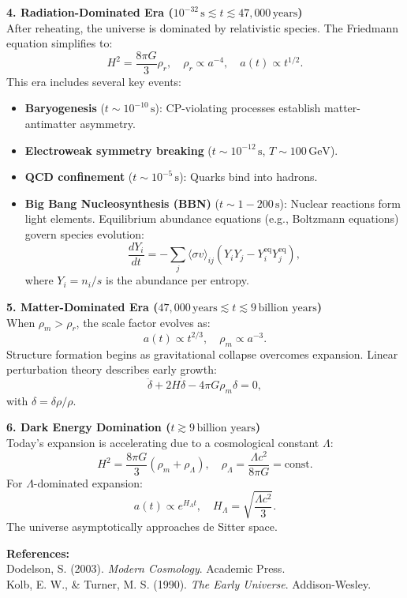 \begin{technical}
\noindent\textbf{4. Radiation-Dominated Era \boldmath(\( 10^{-32} \, \text{s} \lesssim t \lesssim 47{,}000 \, \text{years} \))}\\[0.5em]
After reheating, the universe is dominated by relativistic species. The Friedmann equation simplifies to:
\[
H^2 = \frac{8\pi G}{3} \rho_r, \quad \rho_r \propto a^{-4}, \quad a(t) \propto t^{1/2}.
\]
This era includes several key events:
\begin{itemize}
\item \textbf{Baryogenesis} (\( t \sim 10^{-10} \, \text{s} \)): CP-violating processes establish matter-antimatter asymmetry.
\item \textbf{Electroweak symmetry breaking} (\( t \sim 10^{-12} \, \text{s} \), \( T \sim 100\,\text{GeV} \)).
\item \textbf{QCD confinement} (\( t \sim 10^{-5} \, \text{s} \)): Quarks bind into hadrons.
\item \textbf{Big Bang Nucleosynthesis (BBN)} (\( t \sim 1 - 200 \, \text{s} \)): Nuclear reactions form light elements. Equilibrium abundance equations (e.g., Boltzmann equations) govern species evolution:
\[
\frac{dY_i}{dt} = - \sum_j \langle \sigma v \rangle_{ij} \left( Y_i Y_j - Y_i^{\text{eq}} Y_j^{\text{eq}} \right),
\]
where \( Y_i = n_i/s \) is the abundance per entropy.
\end{itemize}

\noindent\textbf{5. Matter-Dominated Era \boldmath(\( 47{,}000 \, \text{years} \lesssim t \lesssim 9\,\text{billion years} \))}\\[0.5em]
When \(\rho_m > \rho_r\), the scale factor evolves as:
\[
a(t) \propto t^{2/3}, \quad \rho_m \propto a^{-3}.
\]
Structure formation begins as gravitational collapse overcomes expansion. Linear perturbation theory describes early growth:
\[
\ddot{\delta} + 2 H \dot{\delta} - 4\pi G \rho_m \delta = 0,
\]
with \(\delta = \delta\rho/\rho\).

\noindent\textbf{6. Dark Energy Domination \boldmath(\( t \gtrsim 9\,\text{billion years} \))}\\[0.5em]
Today’s expansion is accelerating due to a cosmological constant \(\Lambda\):
\[
H^2 = \frac{8\pi G}{3} (\rho_m + \rho_\Lambda), \quad \rho_\Lambda = \frac{\Lambda c^2}{8\pi G} = \text{const.}
\]
For \(\Lambda\)-dominated expansion:
\[
a(t) \propto e^{H_\Lambda t}, \quad H_\Lambda = \sqrt{\frac{\Lambda c^2}{3}}.
\]
The universe asymptotically approaches de Sitter space.

\vspace{0.5em}
\noindent\textbf{References:}\\
Dodelson, S. (2003). \textit{Modern Cosmology}. Academic Press.\\
Kolb, E. W., \& Turner, M. S. (1990). \textit{The Early Universe}. Addison-Wesley.
\end{technical}
